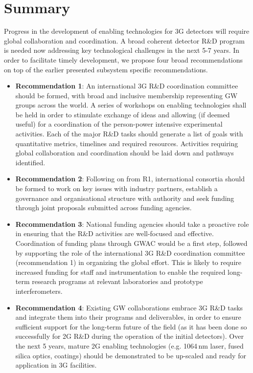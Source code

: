\chapter{Summary}
\label{sec:Summary}
\vspace{1cm}
Progress in the development of enabling technologies for 3G detectors will require global collaboration and coordination. A broad coherent detector R\&D program is needed now addressing key technological challenges in the next 5-7 years. In order to facilitate timely development, we propose four broad recommendations on top of the earlier presented subsystem specific recommendations.

\begin{itemize}
\item \textbf{Recommendation 1}:  An international 3G R\&D coordination committee should be formed, with broad and inclusive membership representing GW groups across the world. A series of workshops on enabling technologies shall be held in order to stimulate exchange of ideas and allowing (if deemed useful) for a coordination of the person-power intensive experimental activities.  Each of the major R\&D tasks should generate a list of  goals with quantitative metrics,  timelines and required resources.   Activities requiring global collaboration and coordination should be laid down and pathways identified.
\item \textbf{Recommendation 2}:  Following on from R1, international consortia should be formed to work on key issues with industry partners, establish a governance and organisational structure with authority and seek funding through joint proposals submitted across funding agencies. 
\item \textbf{Recommendation 3}: National funding agencies should take a proactive role in ensuring that the R\&D activities are well-focused and effective.  Coordination of funding plans through GWAC would be a first step, followed by supporting the role of the international 3G R\&D coordination committee (recommendation 1) in organizing the global effort.  This is likely to require increased funding for staff and instrumentation to enable the required long-term research programs at relevant laboratories and prototype interferometers.
\item \textbf{Recommendation 4}: Existing GW collaborations embrace 3G R\&D tasks and integrate them into their programs and deliverables, in order to ensure sufficient support for the long-term future of the field (as it has been done so successfully for 2G R\&D during the operation of the initial detectors). Over the next 5 years, mature 2G enabling technologies (e.g. 1064\,nm laser, fused silica optics, coatings) should be demonstrated to be up-scaled and ready for application in 3G facilities.
\end{itemize}
